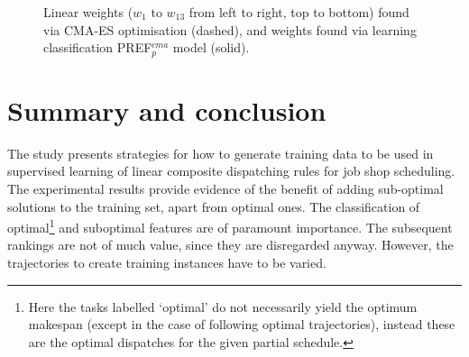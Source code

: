 \documentclass[smallextended]{llncs}
\newcommand{\PREF}[2]{PREF$_{#2}^{#1}$}
\begin{document}
\begin{figure}\centering
{}
\caption{Linear weights ($w_1$ to $w_{13}$ from left to right, top to bottom) found via CMA-ES optimisation (dashed), and weights found via learning classification \PREF{cma}{p} model (solid). }\label{fig:weights}
\end{figure}

\section{Summary and conclusion}\label{sec:summary}
The study presents strategies for how to generate training data to be used in supervised learning of linear composite dispatching rules for job shop scheduling.
The experimental results provide evidence of the benefit of adding sub-optimal solutions to the training set, apart from optimal ones.
The classification of optimal\footnote{Here the tasks labelled `optimal' do not necessarily yield the optimum makespan (except in the case of following optimal trajectories), instead these are the optimal dispatches for the given partial schedule.} and suboptimal features are of paramount importance. The subsequent rankings are not of much value, since they are disregarded anyway. However, the trajectories to create training instances have to be varied.
\end{document}
